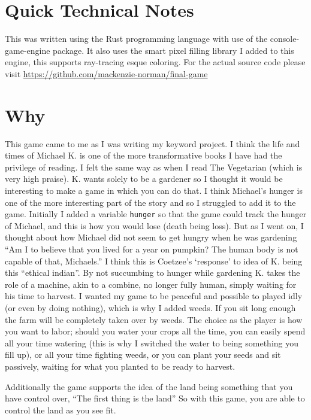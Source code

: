 \documentclass{article}
\begin{document}
\section*{Quick Technical Notes }
This was written using the Rust programming language with use of the console-game-engine package. It also uses the smart pixel filling library I added to this engine, this supports ray-tracing esque coloring. For the actual source code please visit \url{https://github.com/mackenzie-norman/final-game}


\section*{Why}
This game came to me as I was writing my keyword project. I think the life and times of Michael K. is one of the more transformative books I have had the privilege of reading. I felt the same way as when I read The Vegetarian (which is very high praise).
K. wants solely to be a gardener so I thought it would be interesting to make a game in which you can do that. I think Michael's hunger is one of the more interesting part of the story and so I struggled to add it to the game. Initially I added a variable \lstinline[language=c]|hunger| so that the game could track the hunger of Michael, and this is how you would lose (death being loss). But as I went on, I thought about how Michael did not seem to get hungry when he was gardening ``Am I to believe that you lived for a year on pumpkin? The human body is not capable of that, Michaels.'' 
I think this is Coetzee's `response' to idea of K. being this ``ethical indian''. By not succumbing to hunger while gardening K. takes the role of a machine, akin to a combine, no longer fully human, simply waiting for his time to harvest. 
I wanted my game to be peaceful and possible to played idly (or even by doing nothing), which is why I added weeds. If you sit long enough the farm will be completely taken over by weeds. The choice as the player is how you want to labor; should you water your crops all the time, you can easily spend all your time watering (this is why I switched the water to being something you fill up), or all your time fighting weeds, or you can plant your seeds and sit passively, waiting for what you planted to be ready to harvest.

Additionally the game supports the idea of the land being something that you have control over, ``The first thing is the land'' So with this game, you are able to control the land as you see fit. 
\end{document}
